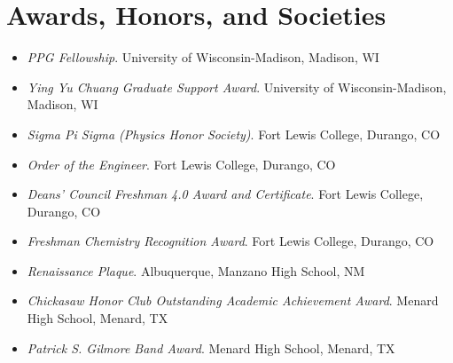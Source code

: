 \section{Awards, Honors, and Societies}

\begin{itemize}[noitemsep,topsep=0pt]
    \item \textit{PPG Fellowship}. University of Wisconsin-Madison, Madison, WI
    \item \textit{Ying Yu Chuang Graduate Support Award}. University of Wisconsin-Madison, Madison, WI
    \item \textit{Sigma Pi Sigma (Physics Honor Society)}. Fort Lewis College, Durango, CO
    \item \textit{Order of the Engineer}. Fort Lewis College, Durango, CO
    \item \textit{Deans' Council Freshman 4.0 Award and Certificate}. Fort Lewis College, Durango, CO
    \item \textit{Freshman Chemistry Recognition Award}. Fort Lewis College, Durango, CO
    \item \textit{Renaissance Plaque}. Albuquerque, Manzano High School, NM
    \item \textit{Chickasaw Honor Club Outstanding Academic Achievement Award}. Menard High School, Menard, TX
    \item \textit{Patrick S. Gilmore Band Award}. Menard High School, Menard, TX
\end{itemize}
